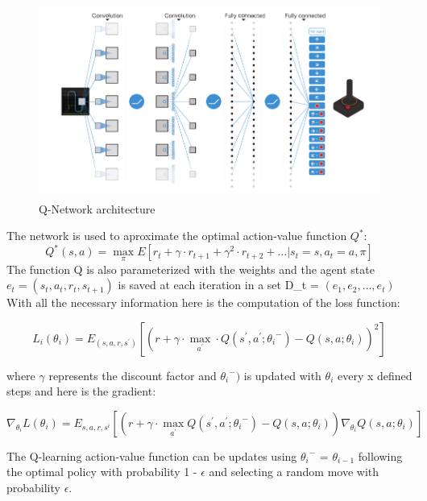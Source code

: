 \begin{figure}[h]
	\begin{center}
		\includegraphics[width=442px,height=242px]{src/img/state/schematic-ilustration}
		\caption{Q-Network architecture\cite{nature}} \label{fig:arch}
    \end{center}
\end{figure}

The network is used to aproximate the optimal action-value function $Q^{*}$\cite{nature}:
\begin{equation}
	Q^{*}(s,a) = \max_\pi E[r_t + \gamma\cdot r_{t+1} + \gamma^2\cdot r_{t+2} + \dotsc | s_t = s, a_t = a, \pi]
\end{equation}
The function Q is also parameterized with the weights and the agent state $e_t = (s_t,a_t,r_t,s_{t+1})$ is saved at each iteration in a set D_t = ${(e_1, e_2, \dotsc, e_t)}$
With all the necessary information here is the computation of the loss function\cite{nature}:

\begin{equation}
	L_i(\theta_i)=E_{(s,a,r,s^{\prime})}[(r + \gamma\cdot\max_{a^{\prime}}\cdot Q(s^{\prime},a^{\prime};{\theta_i}^-) - Q(s,a;\theta_i))^2]
\end{equation}

where $\gamma$ represents the discount factor and ${\theta_i}^-)$ is updated with $\theta_i$ every x defined steps and here is the gradient\cite{nature}:

\begin{equation}
\nabla_{\theta_i}L(\theta_i) = E_{s,a,r,{s^i}}[(r + \gamma\cdot\max_{a^{\prime}}Q(s^\prime, a^\prime;{\theta_i}^-)-Q(s,a;\theta_i))\nabla_{\theta_i}Q(s,a;\theta_i)]
\end{equation}

The Q-learning action-value function can be updates using ${\theta_i}^-$ = $\theta_{i-1}$ following the optimal policy with probability 1 - $\epsilon$ and selecting a random move with probability $\epsilon$. 

